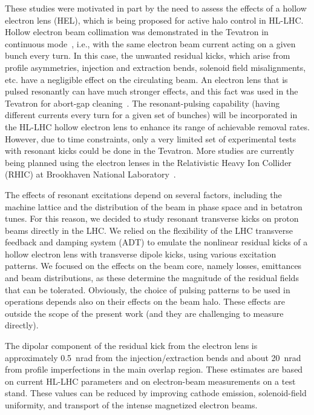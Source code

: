 \documentclass[
prstab
,reprint
,linenumbers
,longbibliography
,preprintnumbers
,showkeys
,amsfonts,amssymb,amsmath
,floatfix
]{revtex4-1}
\begin{document}
These studies were motivated in part by the need to assess the effects
of a hollow electron lens (HEL), which is being proposed for active
halo control in HL-LHC. Hollow electron beam collimation was
demonstrated in the Tevatron in continuous
mode~\cite{hel_tevatron_stancari}, i.e., with the same electron beam
current acting on a given bunch every turn. In this case, the unwanted
residual kicks, which arise from profile asymmetries, injection and
extraction bends, solenoid field misalignments, etc. have a negligible
effect on the circulating beam. An electron lens that is pulsed
resonantly can have much stronger effects, and this fact was used in
the Tevatron for abort-gap
cleaning~\cite{hel_tevatron_abortgap_zhang}. The resonant-pulsing
capability (having different currents every turn for a given set of
bunches) will be incorporated in the HL-LHC hollow electron lens to
enhance its range of achievable removal rates. However, due to time
constraints, only a very limited set of experimental tests with
resonant kicks could be done in the Tevatron. More studies are
currently being planned using the electron lenses in the Relativistic
Heavy Ion Collider (RHIC) at Brookhaven National
Laboratory~\cite{Fischer:PRL:2015}.

The effects of resonant excitations depend on several factors,
including the machine lattice and the distribution of the beam in
phase space and in betatron tunes. For this reason, we decided to
study resonant transverse kicks on proton beams directly in the
LHC. We relied on the flexibility of the LHC transverse feedback and
damping system (ADT) to emulate the nonlinear residual kicks of a
hollow electron lens with transverse dipole kicks, using various
excitation patterns. We focused on the effects on the beam core,
namely losses, emittances and beam distributions, as these determine
the magnitude of the residual fields that can be tolerated. Obviously,
the choice of pulsing patterns to be used in operations depends also
on their effects on the beam halo. These effects are outside the scope
of the present work (and they are challenging to measure directly).

The dipolar component of the residual kick from the electron lens is
approximately 0.5~nrad from the injection/extraction bends and about
20~nrad from profile imperfections in the main overlap region. These
estimates are based on current HL-LHC parameters and on electron-beam
measurements on a test stand. These values can be reduced by improving
cathode emission, solenoid-field uniformity, and transport of the
intense magnetized electron beams.
\end{document}
